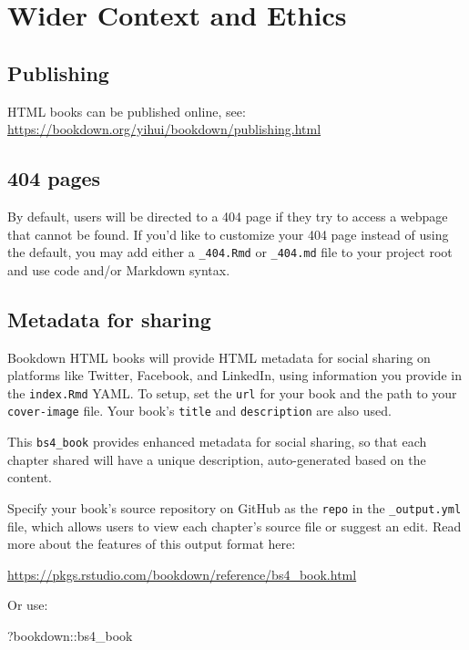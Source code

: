 \documentclass[
  12pt,
]{book}
\newenvironment{Shaded}{\begin{snugshade}}{\end{snugshade}}
\newcommand{\NormalTok}[1]{#1}
\newcommand{\SpecialCharTok}[1]{\textcolor[rgb]{0.00,0.00,0.00}{#1}}
\theoremstyle{definition}
\theoremstyle{definition}
\theoremstyle{definition}
\theoremstyle{definition}
\theoremstyle{remark}
\begin{document}
\hypertarget{context}{%
\chapter{Wider Context and Ethics}\label{context}}

\hypertarget{publishing}{%
\section{Publishing}\label{publishing}}

HTML books can be published online, see: \url{https://bookdown.org/yihui/bookdown/publishing.html}

\hypertarget{pages}{%
\section{404 pages}\label{pages}}

By default, users will be directed to a 404 page if they try to access a webpage that cannot be found. If you'd like to customize your 404 page instead of using the default, you may add either a \texttt{\_404.Rmd} or \texttt{\_404.md} file to your project root and use code and/or Markdown syntax.

\hypertarget{metadata-for-sharing}{%
\section{Metadata for sharing}\label{metadata-for-sharing}}

Bookdown HTML books will provide HTML metadata for social sharing on platforms like Twitter, Facebook, and LinkedIn, using information you provide in the \texttt{index.Rmd} YAML. To setup, set the \texttt{url} for your book and the path to your \texttt{cover-image} file. Your book's \texttt{title} and \texttt{description} are also used.

This \texttt{bs4\_book} provides enhanced metadata for social sharing, so that each chapter shared will have a unique description, auto-generated based on the content.

Specify your book's source repository on GitHub as the \texttt{repo} in the \texttt{\_output.yml} file, which allows users to view each chapter's source file or suggest an edit. Read more about the features of this output format here:

\url{https://pkgs.rstudio.com/bookdown/reference/bs4_book.html}

Or use:

\begin{Shaded}
\begin{Highlighting}[]
\NormalTok{?bookdown}\SpecialCharTok{::}\NormalTok{bs4\_book}
\end{Highlighting}
\end{Shaded}


  
\end{document}
